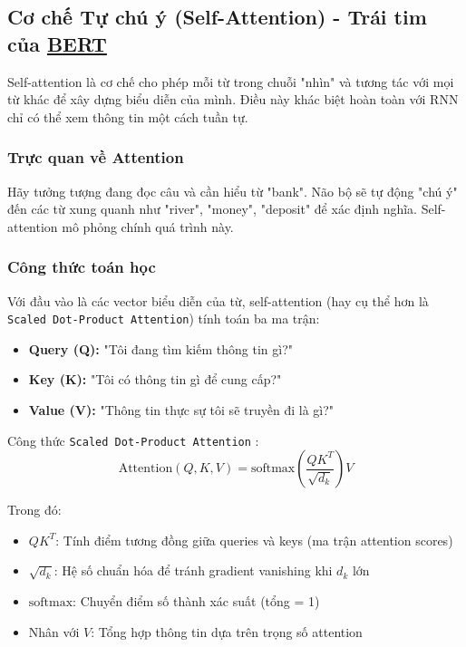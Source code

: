 \subsection{Cơ chế Tự chú ý (Self-Attention) - Trái tim của \hyperref[acro:bert]{\textbf{BERT}}}
\label{ssec:self_attention}
Self-attention là cơ chế cho phép mỗi từ trong chuỗi "nhìn" và tương tác với mọi từ khác để xây dựng biểu diễn của mình.
Điều này khác biệt hoàn toàn với RNN chỉ có thể xem thông tin một cách tuần tự.
\subsubsection{Trực quan về Attention}
Hãy tưởng tượng đang đọc câu và cần hiểu từ "bank".
Não bộ sẽ tự động "chú ý" đến các từ xung quanh như "river", "money", "deposit" để xác định nghĩa.
Self-attention mô phỏng chính quá trình này.

\subsubsection{Công thức toán học}
Với đầu vào là các vector biểu diễn của từ, self-attention (hay cụ thể hơn là \texttt{Scaled Dot-Product Attention}) tính toán ba ma trận:
\begin{itemize}
    \item \textbf{Query (Q):} "Tôi đang tìm kiếm thông tin gì?"
    \item \textbf{Key (K):} "Tôi có thông tin gì để cung cấp?"
    \item \textbf{Value (V):} "Thông tin thực sự tôi sẽ truyền đi là gì?"
\end{itemize}

Công thức \texttt{Scaled Dot-Product Attention} \cite{vaswani2017attention}:
$$ \text{Attention}(Q, K, V) = \text{softmax}\left(\frac{QK^T}{\sqrt{d_k}}\right)V $$

Trong đó:
\begin{itemize}
    \item $QK^T$: Tính điểm tương đồng giữa queries và keys (ma trận attention scores)
    \item $\sqrt{d_k}$: Hệ số chuẩn hóa để tránh gradient vanishing khi $d_k$ lớn
    \item $\text{softmax}$: Chuyển điểm số thành xác suất (tổng = 1)
    \item Nhân với $V$: Tổng hợp thông tin dựa trên trọng số attention
\end{itemize}

